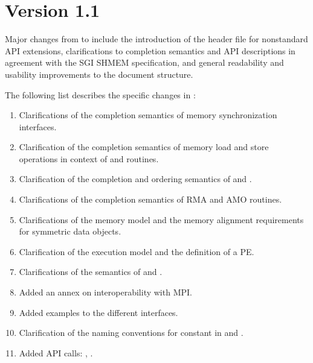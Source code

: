 \section{Version 1.1}
Major changes from \openshmem[1.0] to \openshmem[1.1] include
the introduction of the  header file for nonstandard \ac{API}
extensions,
clarifications to completion semantics and \ac{API} descriptions in agreement with
the \ac{SGI} SHMEM specification,
and general readability and usability improvements to the document structure.

The following list describes the specific changes in \openshmem[1.1]:
\begin{enumerate}
%
\item Clarifications of the completion semantics of memory synchronization
      interfaces.
%
%
\item Clarification of the completion semantics of memory load and store
      operations in context of  and 
      routines.
%
%
\item Clarification of the completion and ordering semantics of
       and .
%
%
\item Clarifications of the completion semantics of \ac{RMA} and \ac{AMO}
      routines.
%
%
\item Clarifications of the memory model and the memory alignment requirements
      for symmetric data objects.
%
%
\item Clarification of the execution model and the definition of a \ac{PE}.
%
%
\item Clarifications of the semantics of  and
      .
%
%
\item Added an annex on interoperability with \ac{MPI}.
%
%
\item Added examples to the different interfaces.
%
\item Clarification of the naming conventions for constant in \Cstd and
      \Fortran.
%
%
\item Added \ac{API} calls: , .

\end{enumerate}

